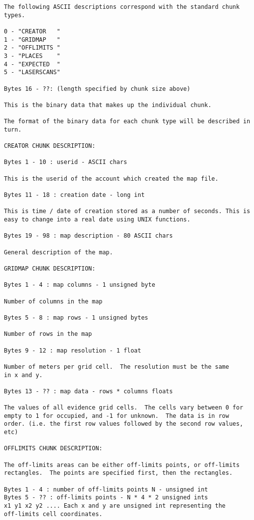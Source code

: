 \documentclass{article}
\begin{document}
\begin{verbatim}
The following ASCII descriptions correspond with the standard chunk
types.

0 - "CREATOR   "
1 - "GRIDMAP   "
2 - "OFFLIMITS "
3 - "PLACES    "
4 - "EXPECTED  "
5 - "LASERSCANS"

Bytes 16 - ??: (length specified by chunk size above)

This is the binary data that makes up the individual chunk.

The format of the binary data for each chunk type will be described in
turn.

CREATOR CHUNK DESCRIPTION:

Bytes 1 - 10 : userid - ASCII chars

This is the userid of the account which created the map file.

Bytes 11 - 18 : creation date - long int

This is time / date of creation stored as a number of seconds. This is
easy to change into a real date using UNIX functions.

Bytes 19 - 98 : map description - 80 ASCII chars

General description of the map.

GRIDMAP CHUNK DESCRIPTION:

Bytes 1 - 4 : map columns - 1 unsigned byte

Number of columns in the map

Bytes 5 - 8 : map rows - 1 unsigned bytes

Number of rows in the map

Bytes 9 - 12 : map resolution - 1 float

Number of meters per grid cell.  The resolution must be the same
in x and y.

Bytes 13 - ?? : map data - rows * columns floats

The values of all evidence grid cells.  The cells vary between 0 for
empty to 1 for occupied, and -1 for unknown.  The data is in row
order. (i.e. the first row values followed by the second row values, etc)

OFFLIMITS CHUNK DESCRIPTION:

The off-limits areas can be either off-limits points, or off-limits
rectangles.  The points are specified first, then the rectangles.

Bytes 1 - 4 : number of off-limits points N - unsigned int
Bytes 5 - ?? : off-limits points - N * 4 * 2 unsigned ints
x1 y1 x2 y2 .... Each x and y are unsigned int representing the
off-limits cell coordinates.


\end{verbatim}
\end{document}
